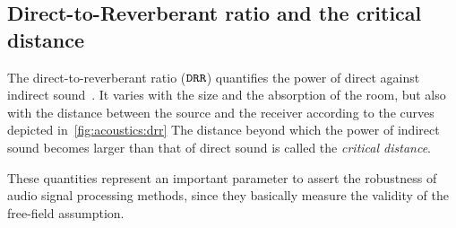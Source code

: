 \subsection{Direct-to-Reverberant ratio and the critical distance}\label{ch:acoustics:subsec:drr}
The direct-to-reverberant ratio ($\mathtt{DRR}$) quantifies the power of direct against indirect sound~.
It varies with the size and the absorption of the room, but also with the distance between the source and the receiver according to the curves
depicted in~\cref{fig:acoustics:drr}
The distance beyond which the power of indirect sound becomes larger than that of direct sound is called the \textit{critical distance}.

These quantities represent an important parameter to assert the robustness of audio signal processing methods,
since they basically measure the validity of the free-field assumption.


